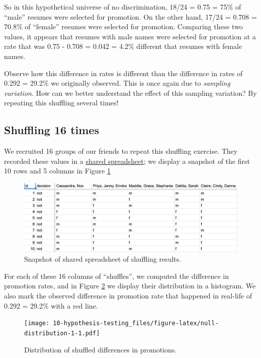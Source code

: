 \documentclass[
]{book}
\begin{document}
So in this hypothetical universe of no discrimination, 18/24 = 0.75 = 75\% of ``male'' resumes were selected for promotion. On the other hand, 17/24 = 0.708 = 70.8\% of ``female'' resumes were selected for promotion. Comparing these two values, it appears that resumes with male names were selected for promotion at a rate that was 0.75 - 0.708 = 0.042 = 4.2\% different that resumes with female names.

Observe how this difference in rates is different than the difference in rates of 0.292 = 29.2\% we originally observed. This is once again due to \emph{sampling variation}. How can we better understand the effect of this sampling variation? By repeating this shuffling several times!

\hypertarget{shuffling-16-times}{%
\subsection{Shuffling 16 times}\label{shuffling-16-times}}

We recruited 16 groups of our friends to repeat this shuffling exercise. They recorded these values in a \href{https://docs.google.com/spreadsheets/d/1Q-ENy3o5IrpJshJ7gn3hJ5A0TOWV2AZrKNHMsshQtiE/}{shared spreadsheet}; we display a snapshot of the first 10 rows and 5 columns in Figure \ref{fig:tactile-shuffling}

\begin{figure}
\includegraphics[width=1\linewidth]{images/sampling/promotions/shared_spreadsheet} \caption{Snapshot of shared spreadsheet of shuffling results.}\label{fig:tactile-shuffling}
\end{figure}

For each of these 16 columns of ``shuffles'', we computed the difference in promotion rates, and in Figure \ref{fig:null-distribution-1} we display their distribution in a histogram. We also mark the observed difference in promotion rate that happened in real-life of 0.292 = 29.2\% with a red line.

\begin{figure}
\centering
\texttt{[image: 10-hypothesis-testing\_files/figure-latex/null-distribution-1-1.pdf]}
\caption{\label{fig:null-distribution-1}Distribution of shuffled differences in promotions.}
\end{figure}
\end{document}
